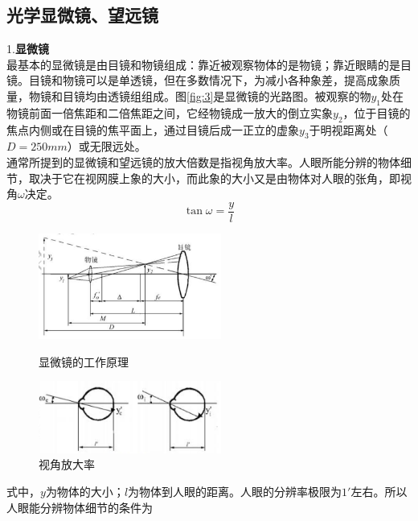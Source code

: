 \documentclass{article}
\begin{document}
\subsection{光学显微镜、望远镜}
1.\textbf{显微镜}\\
\hspace*{2em}最基本的显微镜是由目镜和物镜组成：靠近被观察物体的是物镜；靠近眼睛的是目镜。目镜和物镜可以是单透镜，但在多数情况下，为减小各种象差，提高成象质量，物镜和目镜均由透镜组组成。图\ref{fig:3}是显微镜的光路图。被观察的物\(y_1\)处在物镜前面一倍焦距和二倍焦距之间，它经物镜成一放大的倒立实象\(y_2\)，位于目镜的焦点内侧或在目镜的焦平面上，通过目镜后成一正立的虚象\(y_3\)于明视距离处（\(D = 250mm\)）或无限远处。\\
\hspace*{2em}通常所提到的显微镜和望远镜的放大倍数是指视角放大率。人眼所能分辨的物体细节，取决于它在视网膜上象的大小，而此象的大小又是由物体对人眼的张角，即视角\(\omega\)决定。
\begin{equation}
    \tan \omega =\frac{y}{l}
\end{equation}
\begin{figure}[h]
    \centering
    \begin{minipage}{0.45\textwidth} %
        \centering
        \includegraphics[width=6cm]{2.2.1.png} %
        \caption{显微镜的工作原理}
    \end{minipage}\hfill
    \centering
    \begin{minipage}{0.45\textwidth} %
        \centering
        \includegraphics[width=6cm]{2.2.2.png} %
        \caption{视角放大率}
    \end{minipage}\hfill
\end{figure}
\hspace*{2em}式中，\(y\)为物体的大小；\(l\)为物体到人眼的距离。人眼的分辨率极限为\(1'\)左右。所以人眼能分辨物体细节的条件为
\end{document}
